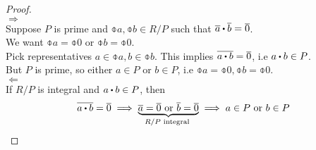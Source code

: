 \documentclass[../Main.tex]{subfiles}
\begin{document}
\begin{proof}~\\
	$\Rightarrow$\\
	Suppose $P$ is prime and  $\obar{a},\obar{b}\in R/P$ such that $\obar{a}\rdot \obar{b}=\obar{0}$.\\
	We want $\obar{a}=\obar{0}$ or $\obar{b}=\obar{0}$.\\
	Pick representatives $a\in \obar{a}, b\in \obar{b}$. This implies $\obar{a\rdot  b} = \obar{0}$, i.e $a\rdot b \in P$.\\
	But $P$ is prime, so either $a\in P$ or $b \in P$, i.e $\obar{a}=\obar{0},\obar{b}=\obar{0}$.\\
	$\Leftarrow$\\
	If $R/P$ is integral and $a\rdot b\in P$, then
	\[\obar{a\rdot b}=\obar{0}\implies \underbrace{\obar{a}=\obar{0} \text{ or } \obar{b} = \obar{0}}_{R/P \text{ integral }} \implies a\in P \text{ or } b \in P\qedhere\]
\end{proof}
\end{document}

